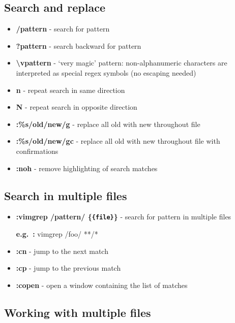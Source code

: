 \documentclass[twocolumn]{article}
\providecommand{\tightlist}{%
  \setlength{\itemsep}{0pt}\setlength{\parskip}{0pt}}
\begin{document}
\hypertarget{search-and-replace}{%
\subsection{Search and replace}\label{search-and-replace}}

\begin{itemize}
\tightlist
\item
  \textbf{/pattern} - search for pattern
\item
  \textbf{?pattern} - search backward for pattern
\item
    \textbf{\textbackslash vpattern} - `very magic' pattern: non-alphanumeric characters are
  interpreted as special regex symbols (no escaping needed)
\item
  \textbf{n} - repeat search in same direction
\item
  \textbf{N} - repeat search in opposite direction
\item
  \textbf{:\%s/old/new/g} - replace all old with new throughout file
\item
  \textbf{:\%s/old/new/gc} - replace all old with new throughout file
  with confirmations
\item
  \textbf{:noh} - remove highlighting of search matches
\end{itemize}

\hypertarget{search-in-multiple-files}{%
\subsection{Search in multiple files}\label{search-in-multiple-files}}

\begin{itemize}
\item
  \textbf{:vimgrep /pattern/ \{\texttt{\{file\}}\}} - search for pattern
  in multiple files

  \textbf{e.g.~:} vimgrep /foo/ **/*
\item
  \textbf{:cn} - jump to the next match
\item
  \textbf{:cp} - jump to the previous match
\item
  \textbf{:copen} - open a window containing the list of matches
\end{itemize}

\hypertarget{working-with-multiple-files}{%
\subsection{Working with multiple
files}\label{working-with-multiple-files}}
\end{document}
